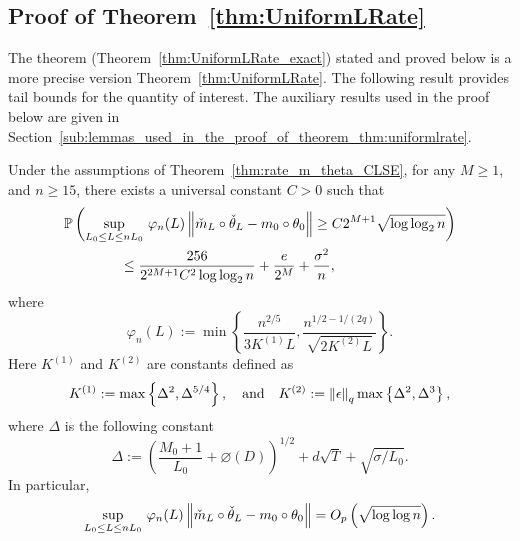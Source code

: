 \subsection{Proof of Theorem~\ref{thm:UniformLRate}}\label{proof:UniformLRate}
The theorem (Theorem~\ref{thm:UniformLRate_exact}) stated and proved below is a more precise version Theorem~\ref{thm:UniformLRate}. The following result provides tail bounds for the quantity of interest.  The auxiliary results used in the proof below are given in Section~\ref{sub:lemmas_used_in_the_proof_of_theorem_thm:uniformlrate}.
\begin{thm}\label{thm:UniformLRate_exact}
Under the assumptions of Theorem~\ref{thm:rate_m_theta_CLSE}, for any $M \ge 1$, and $n\ge 15$, there exists a universal constant $C > 0$ such that
\begin{align}\label{eq:uniform_exact_prob}
\begin{split}
&\mathbb{P}\left(\sup_{L_0 \le L \le nL_0}\,\varphi_n(L)\left\lVert\check{m}_L\circ\check{\theta}_L - m_0\circ\theta_0\right\rVert \ge C2^{M+1} \sqrt{\log\log_2n}\right)\\ &\qquad\qquad\le \frac{256}{2^{2M+1} C^2\log\log_2n} + \frac{e}{2^M} + \frac{\sigma^2}{n},
\end{split}
\end{align}
where 
\begin{equation}\label{eq:DefVarphi}
\varphi_n(L) := \min\left\{\frac{n^{2/5}}{3K^{(1)}L}, \frac{n^{1/2 - 1/(2q)}}{\sqrt{2K^{(2)}L}}\right\}.
\end{equation}
Here $K^{(1)}$ and $K^{(2)}$ are constants defined as
\begin{equation}\label{eq:DefK1K2}
K^{(1)} := \max\left\{\Delta^2, \Delta^{5/4}\right\},\quad\mbox{and}\quad K^{(2)} := \left\lVert\epsilon\right\rVert_q\max\left\{\Delta^2, \Delta^3\right\},
\end{equation}
where $\Delta$ is the following constant
\begin{equation}\label{eq:LambdaDef}
\Delta := \left(\frac{M_0 + 1}{L_0} + \diameter(D)\right)^{1/2} + d\sqrt{T} + \sqrt{\sigma/L_0}.
\end{equation}
In particular,
\begin{equation}\label{eq:UniformLRate1}
\sup_{L_0 \le L \le nL_0}\,\varphi_n(L)\left\lVert\check{m}_L\circ\check{\theta}_L - m_0\circ\theta_0\right\rVert = O_p\left(\sqrt{\log\log n}\right).
\end{equation}

\end{thm}
